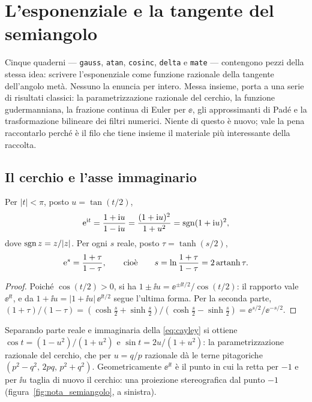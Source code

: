 \section{L'esponenziale e la tangente del semiangolo}
\label{sec:semiangolo}

Cinque quaderni --- \texttt{gauss}, \texttt{atan}, \texttt{cosinc},
\texttt{delta} e \texttt{mate} --- contengono pezzi della stessa idea:
scrivere l'esponenziale come funzione razionale della tangente dell'angolo
met\`a. Nessuno la enuncia per intero. Messa insieme, porta a una serie di
risultati classici: la parametrizzazione razionale del cerchio, la funzione
gudermanniana, la frazione continua di Euler per $\ee$, gli approssimanti di
Pad\'e e la trasformazione bilineare dei filtri numerici. Niente di questo
\`e nuovo; vale la pena raccontarlo perch\'e \`e il filo che tiene insieme il
materiale pi\`u interessante della raccolta.

\subsection{Il cerchio e l'asse immaginario}

\begin{prop}\label{prop:semiangolo}
Per $|t|<\pi$, posto $u=\tan(t/2)$,
\begin{equation}\label{eq:cayley}
  \mathrm{e}^{\mathrm{i} t}=\frac{1+\mathrm{i} u}{1-\mathrm{i} u}=\frac{(1+\mathrm{i} u)^2}{1+u^2}
  =\operatorname{sgn}(1+\mathrm{i} u)^2 ,
\end{equation}
dove $\operatorname{sgn} z=z/|z|$. Per ogni $s$ reale, posto $\tau=\tanh(s/2)$,
\begin{equation}\label{eq:tanh}
  \mathrm{e}^{s}=\frac{1+\tau}{1-\tau},
  \qquad\text{cio\`e}\qquad
  s=\ln\frac{1+\tau}{1-\tau}=2\operatorname{artanh}\tau .
\end{equation}
\end{prop}

\begin{proof}
Poich\'e $\cos(t/2)>0$, si ha $1\pm\ii u=\ee^{\pm\ii t/2}/\cos(t/2)$: il
rapporto vale $\ee^{\ii t}$, e da $1+\ii u=|1+\ii u|\,\ee^{\ii t/2}$ segue
l'ultima forma. Per la seconda parte,
$(1+\tau)/(1-\tau)=(\cosh\frac s2+\sinh\frac s2)/(\cosh\frac s2-\sinh\frac s2)
=\ee^{s/2}/\ee^{-s/2}$.
\end{proof}

Separando parte reale e immaginaria della \eqref{eq:cayley} si ottiene
$\cos t=(1-u^2)/(1+u^2)$ e $\sin t=2u/(1+u^2)$: la parametrizzazione
razionale del cerchio, che per $u=q/p$ razionale d\`a le terne pitagoriche
$(p^2-q^2,\,2pq,\,p^2+q^2)$. Geometricamente $\ee^{\ii t}$ \`e il punto in
cui la retta per $-1$ e per $\ii u$ taglia di nuovo il cerchio: una
proiezione stereografica dal punto $-1$ (figura~\ref{fig:nota_semiangolo},
a sinistra).

